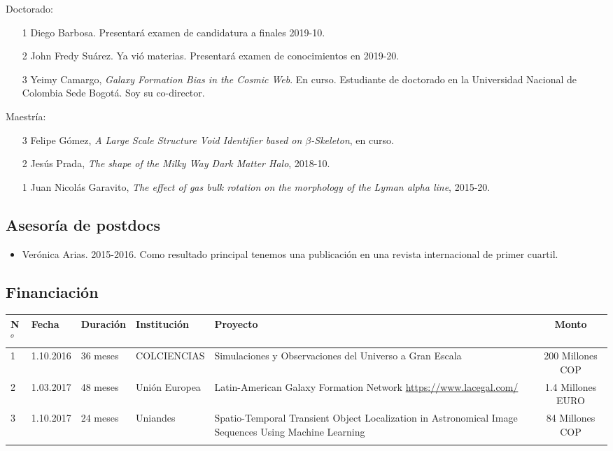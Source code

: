 \documentclass{article}
\begin{document}
Doctorado:
\begin{itemize}
\item [1] Diego Barbosa. Presentar\'a examen de candidatura a finales 2019-10.
\item [2] John Fredy Su\'arez. Ya vi\'o materias. Presentar\'a examen
  de conocimientos en 2019-20.
\item [3] Yeimy Camargo, \emph{Galaxy Formation Bias in the Cosmic
  Web}. En curso. Estudiante de doctorado en la Universidad Nacional de Colombia
  Sede Bogot\'a. Soy su co-director.
\end{itemize}

Maestr\'ia:
\begin{itemize}
\item [3] Felipe G\'omez, \emph{A Large Scale Structure Void
  Identifier based on $\beta$-Skeleton}, en curso.
\item [2] Jes\'us Prada, \emph{The shape of the Milky Way Dark Matter
  Halo}, 2018-10.
\item [1] Juan Nicol\'as Garavito, \emph{The effect of gas bulk rotation
  on the morphology of the Lyman alpha line}, 2015-20.
\end{itemize}


\subsection{Asesor\'ia de postdocs}

\begin{itemize}
\item Ver\'onica Arias. 2015-2016. Como resultado principal tenemos
  una publicaci\'on en una revista internacional de primer cuartil.

\end{itemize}

\subsection{Financiaci\'on}
\begin{tabular}{l l l p{2.4cm} p{4.0cm} c}\hline
N$^{o}$ & Fecha & Duraci\'on & Instituci\'on & Proyecto & Monto \\\hline
1 & 1.10.2016 & 36 meses & COLCIENCIAS & Simulaciones y Observaciones del Universo a Gran Escala & 200 Millones COP\\\hline
2 & 1.03.2017 & 48 meses & Uni\'on Europea & Latin-American Galaxy Formation Network \url{https://www.lacegal.com/} & 1.4 Millones EURO \\\hline
3 & 1.10.2017 & 24 meses & Uniandes & 
Spatio-Temporal Transient Object Localization in Astronomical Image
Sequences Using Machine Learning & 84 Millones COP \\
\\\hline 
\end{tabular}
\end{document}
